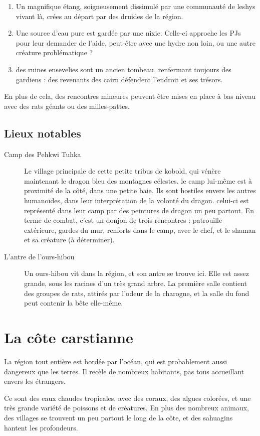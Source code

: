 \documentclass[10pt,a4paper]{book}
\begin{document}
\begin{enumerate}
\item Un magnifique étang, soigneusement dissimulé par une communauté de leshys vivant là, crées au départ par des druides de la région.
\item Une source d'eau pure est gardée par une nixie. Celle-ci approche les PJs pour leur demander de l'aide, peut-être avec une hydre non loin, ou une autre créature problématique ?
\item des ruines ensevelies sont un ancien tombeau, renfermant toujours des gardiens : des revenants des cairn défendent l'endroit et ses trésors.

\end{enumerate}
En plus de cela, des rencontres mineures peuvent être mises en place à bas niveau avec des rats géants ou des milles-pattes.
\subsection{Lieux notables}
\begin{description}
\item[Camp des Pehkwi Tuhka] Le village principale de cette petite tribus de kobold, qui vénère maintenant le dragon bleu des montagnes célestes. le camp lui-même est à proximité de la côté, dans une petite baie. Ils sont hostiles envers les autres humanoïdes, dans leur interprétation de la volonté du dragon. celui-ci est représenté dans leur camp par des peintures de dragon un peu partout. En terme de combat, c'est un donjon de trois rencontres : patrouille extérieure, gardes du mur, renforts dans le camp, avec le chef, et le shaman et sa créature (à déterminer).

\item[L'antre de l'ours-hibou] Un ours-hibou vit dans la région, et son antre se trouve ici. Elle est assez grande, sous les racines d'un très grand arbre. La première salle contient des groupes de rats, attirés par l'odeur de la charogne, et la salle du fond peut contenir la bête elle-même.
\end{description}
\section{La côte carstianne}
La région tout entière est bordée par l'océan, qui est probablement aussi dangereux que les terres. Il recèle de nombreux habitants, pas tous accueillant envers les étrangers.

Ce sont des eaux chaudes tropicales, avec des coraux, des algues colorées, et une très grande variété de poissons et de créatures. En plus des nombreux animaux, des villages se trouvent un peu partout le long de la côte, et des sahuagins hantent les profondeurs.
\end{document}
